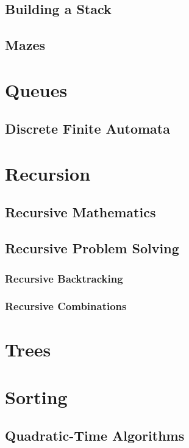 \documentclass[10pt,a4paper]{book}
\begin{document}
\section{Building a Stack}

\section{Mazes}

\chapter{Queues}


\section{Discrete Finite Automata}

\chapter{Recursion}

\section{Recursive Mathematics}

\section{Recursive Problem Solving}

\subsection{Recursive Backtracking}
\subsection{Recursive Combinations}


\chapter{Trees}
\chapter{Sorting}


\section{Quadratic-Time Algorithms}
\end{document}
